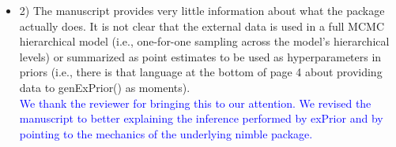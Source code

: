\documentclass{article}
\begin{document}
\begin{itemize}
    \item 2) The manuscript provides very little information about what the package actually does. It is not clear that the external data is used in a full MCMC hierarchical model (i.e., one-for-one sampling across the model's hierarchical levels) or summarized as point estimates to be used as hyperparameters in priors (i.e., there is that language at the bottom of page 4 about providing data to genExPrior() as moments).\\
    \textcolor{blue}{We thank the reviewer for bringing this to our attention. We revised the manuscript to better explaining the inference performed by exPrior and by pointing to the mechanics of the underlying nimble package.}
       

\end{itemize}
\end{document}
